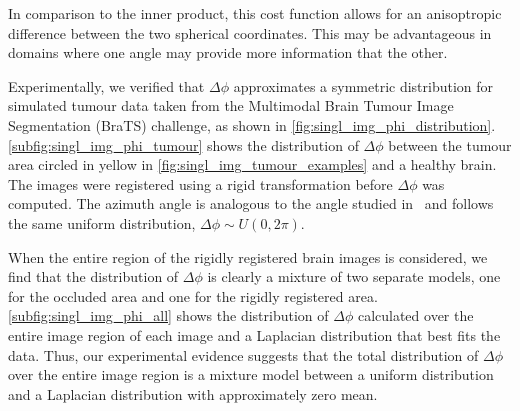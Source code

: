 In comparison to the inner product, this cost function allows for an
anisoptropic difference between the two spherical coordinates. This may be
advantageous in domains where one angle may provide more information that the
other.

Experimentally, we verified that $\Delta \phi$ approximates a symmetric
distribution for simulated tumour data taken from the Multimodal Brain Tumour
Image Segmentation (BraTS) challenge, as shown in
\cref{fig:singl_img_phi_distribution}. \cref{subfig:singl_img_phi_tumour} shows the
distribution of $\Delta \phi$ between the tumour area circled in yellow in
\cref{fig:singl_img_tumour_examples} and a healthy brain. The images were registered
using a rigid transformation before $\Delta \phi$ was computed.  The azimuth
angle is analogous to the angle studied in~\cite{tzimiropoulos2011robust}
and follows the same uniform distribution, $\Delta \phi \sim U(0, 2\pi)$.

When the entire region of the rigidly registered brain images is considered, we
find that the distribution of $\Delta \phi$ is clearly a mixture of two separate
models, one for the occluded area and one for the rigidly registered area.
\cref{subfig:singl_img_phi_all} shows the distribution of $\Delta \phi$ calculated
over the entire image region of each image and a Laplacian distribution that
best fits the data. Thus, our experimental evidence suggests that the total
distribution of $\Delta \phi$ over the entire image region is a mixture model
between a uniform distribution and a Laplacian distribution with approximately
zero mean.
